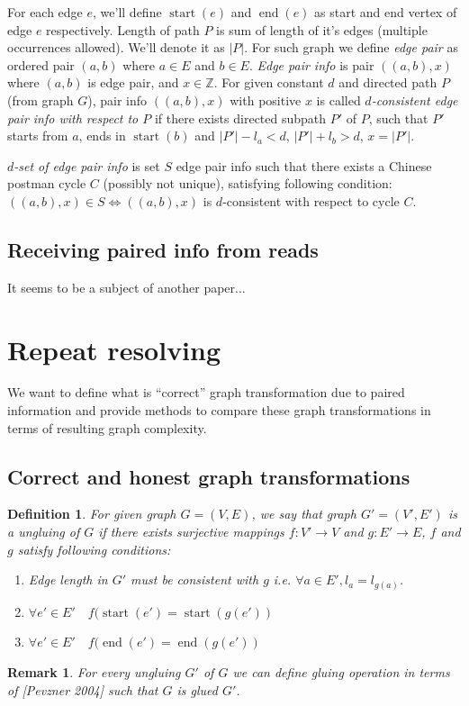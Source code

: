 \documentclass[12pt,a4paper,oneside]{article}
\newtheorem{definition}{Definition}
\newtheorem{remark}{Remark}
\begin{document}
For each edge $e$, we'll define $\mathop{start}(e)$ and $\mathop{end}(e)$ as start and end vertex of edge $e$ respectively. Length of path $P$ is sum of length of it's edges (multiple occurrences allowed). We'll denote it as $|P|$.
For such graph we define \emph{edge pair} as ordered pair $(a, b)$ where $a \in E$ and $b \in E$.
\emph{Edge pair info} is pair $((a, b), x)$ where $(a, b)$ is edge pair, and $x \in \mathbb{Z}$.
For given constant $d$ and directed path $P$ (from graph $G$), pair info $((a, b), x)$ with positive $x$ is called \emph{$d$-consistent edge pair info with respect to $P$} if there exists directed subpath $P'$ of $P$, such that $P'$ starts from $a$, ends in $\mathop{start}(b)$ and $|P'| - l_a < d$, $|P'| + l_b > d$, $x=|P'|$. 

\emph{$d$-set of edge pair info} is set $S$ edge pair info such that there exists a Chinese postman cycle $C$ (possibly not unique), satisfying following condition:
 $((a, b), x) \in S \Leftrightarrow  ((a, b), x)$ is $d$-consistent with respect to cycle $C$.
  
\subsection{Receiving paired info from reads}
It seems to be a subject of another paper...
\section{Repeat resolving}
We want to define what is ``correct'' graph transformation due to paired information and provide methods to compare these graph transformations in terms of resulting graph complexity.

\subsection{Correct and honest graph transformations}
\begin{definition}
For given graph $G=(V, E)$, we say that graph $G' = (V', E')$  is a \emph{ungluing} of $G$ if there exists surjective mappings $f: V' \rightarrow V$ and $g: E' \rightarrow E$, $f$ and $g$
satisfy following conditions:
\begin{enumerate}
\item Edge length in $G'$ must be consistent with $g$ i.e. $\forall a\in E', l_a = l_{g(a)}$. 
\item $\forall e'\in E'\quad f(\mathop{start}(e') = \mathop{start}(g(e'))$
\item $\forall e'\in E'\quad f(\mathop{end}(e') = \mathop{end}(g(e'))$
\end{enumerate}
\end{definition}
\begin{remark}
For every \emph{ungluing} $G'$ of $G$ we can define gluing operation in terms of [Pevzner 2004] such that $G$ is glued $G'$.
\end{remark}
\end{document}
